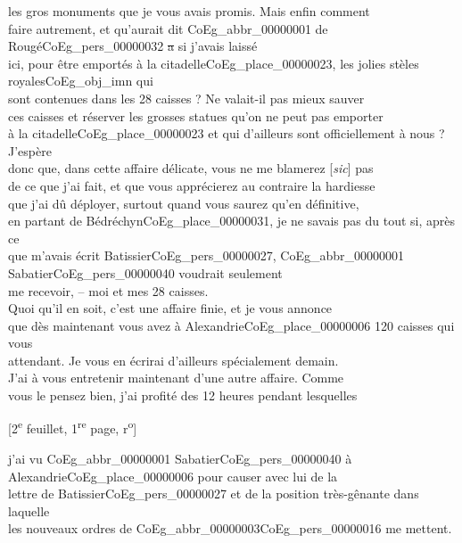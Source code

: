 \documentclass{book}
\begin{document}
les gros monuments que je vous avais promis. Mais enfin comment\\
faire autrement, et qu’aurait dit \gls{CoEg_abbr_00000001} de Rougé\gls{CoEg_pers_00000032} \sout{a} si j’avais laissé\\
ici, pour être emportés à la citadelle\gls{CoEg_place_00000023}, les jolies stèles royales\gls{CoEg_obj_imn} qui\\
sont contenues dans les 28 caisses ? Ne valait-il pas mieux sauver\\
ces caisses et réserver les grosses statues qu’on ne peut pas emporter\\
à la citadelle\gls{CoEg_place_00000023} et qui d’ailleurs sont officiellement à nous ? J’espère\\
donc que, dans cette affaire délicate, vous ne me blamerez {[\textit{sic}]} pas\\
de ce que j’ai fait, et que vous apprécierez au contraire la hardiesse\\
que j’ai dû déployer, surtout quand vous saurez qu’en définitive,\\
en partant de Bédréchyn\gls{CoEg_place_00000031}, je ne savais pas du tout si, après ce\\
que m’avais écrit Batissier\gls{CoEg_pers_00000027}, \gls{CoEg_abbr_00000001} Sabatier\gls{CoEg_pers_00000040} voudrait seulement\\
me recevoir, – moi et mes 28 caisses.\\
\indent Quoi qu’il en soit, c’est une affaire finie, et je vous annonce\\
que dès maintenant vous avez à Alexandrie\gls{CoEg_place_00000006} 120 caisses qui vous\\
attendant. Je vous en écrirai d’ailleurs spécialement demain.\\
\indent J’ai à vous entretenir maintenant d’une autre affaire. Comme\\
vous le pensez bien, j’ai profité des 12 heures pendant lesquelles
{\footnotesize\begin{center} {[2\textsuperscript{e} feuillet, 1\textsuperscript{re} page, r\textsuperscript{o}]}\end{center}}
\noindent j’ai vu \gls{CoEg_abbr_00000001} Sabatier\gls{CoEg_pers_00000040} à Alexandrie\gls{CoEg_place_00000006} pour causer avec lui de la\\
lettre de Batissier\gls{CoEg_pers_00000027} et de la position très-gênante dans laquelle\\
les nouveaux ordres de \gls{CoEg_abbr_00000003}\gls{CoEg_pers_00000016} me mettent.\\
\end{document}
